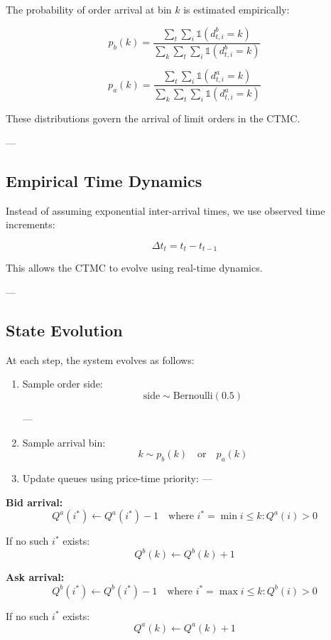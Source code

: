 \documentclass[12pt,a4paper]{report}
\begin{document}
The probability of order arrival at bin $k$ is estimated empirically:

\[
p_b(k) = \frac{\sum_{t} \sum_{i} \mathbb{1}(d^b_{t,i} = k)}{\sum_{k} \sum_{t} \sum_{i} \mathbb{1}(d^b_{t,i} = k)}
\]

\[
p_a(k) = \frac{\sum_{t} \sum_{i} \mathbb{1}(d^a_{t,i} = k)}{\sum_{k} \sum_{t} \sum_{i} \mathbb{1}(d^a_{t,i} = k)}
\]

These distributions govern the arrival of limit orders in the CTMC.

---

\subsection{Empirical Time Dynamics}

Instead of assuming exponential inter-arrival times, we use observed time increments:

\[
\Delta t_t = t_{t} - t_{t-1}
\]

This allows the CTMC to evolve using real-time dynamics.

---

\subsection{State Evolution}

At each step, the system evolves as follows:

\begin{enumerate}
\item Sample order side:
\[
\text{side} \sim \text{Bernoulli}(0.5)
\]

---
\item Sample arrival bin:
\[
k \sim p_b(k) \quad \text{or} \quad p_a(k)
\]

\item Update queues using price-time priority:
---

\end{enumerate}

\textbf{Bid arrival:}
\[
Q^a(i^*) \leftarrow Q^a(i^*) - 1 \quad \text{where } i^* = \min { i \leq k : Q^a(i) > 0 }
\]

If no such $i^*$ exists:
\[
Q^b(k) \leftarrow Q^b(k) + 1
\]

\textbf{Ask arrival:}
\[
Q^b(i^*) \leftarrow Q^b(i^*) - 1 \quad \text{where } i^* = \max { i \leq k : Q^b(i) > 0 }
\]

If no such $i^*$ exists:
\[
Q^a(k) \leftarrow Q^a(k) + 1
\]
\end{document}

